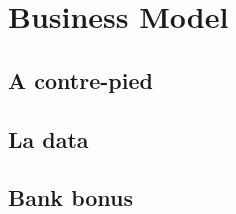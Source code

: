 \section{Business Model}


\subsection{A contre-pied}
\label{sub:A contre-pied}

\subsection{La data}
\label{sub:La data}

\subsection{Bank bonus}
\label{sub:Bank bonus}



